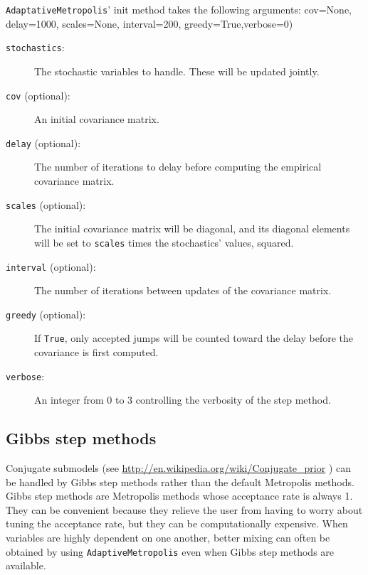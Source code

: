 \texttt{AdaptativeMetropolis}' init method takes the following arguments:
cov=None, delay=1000, scales=None, interval=200, greedy=True,verbose=0)
\begin{description}
   \item[\texttt{stochastics}:] The stochastic variables to handle. These will be updated jointly.
   \item[\texttt{cov} (optional):] An initial covariance matrix.
   \item[\texttt{delay} (optional):] The number of iterations to delay before computing the empirical covariance matrix.
   \item[\texttt{scales} (optional):] The initial covariance matrix will be diagonal, and its diagonal elements will be set to \texttt{scales} times the stochastics' values, squared.
   \item[\texttt{interval} (optional):] The number of iterations between updates of the covariance matrix.
   \item[\texttt{greedy} (optional):] If \texttt{True}, only accepted jumps will be counted toward the delay before the covariance is first computed.
   \item[\texttt{verbose}:] An integer from 0 to 3 controlling the verbosity of the step method.   
\end{description}
 
\hypertarget{gibbs}{}
\subsection*{Gibbs step methods} \label{gibbs}

Conjugate submodels (see \href{http://en.wikipedia.org/wiki/Conjugate_prior}{http://en.wikipedia.org/wiki/Conjugate_prior} ) can be handled by Gibbs step methods rather than the default Metropolis methods. Gibbs step methods are Metropolis methods whose acceptance rate is always 1. They can be convenient because they relieve the user from having to worry about tuning the acceptance rate, but they can be computationally expensive. When variables are highly dependent on one another, better mixing can often be obtained by using \texttt{AdaptiveMetropolis} even when Gibbs step methods are available.

